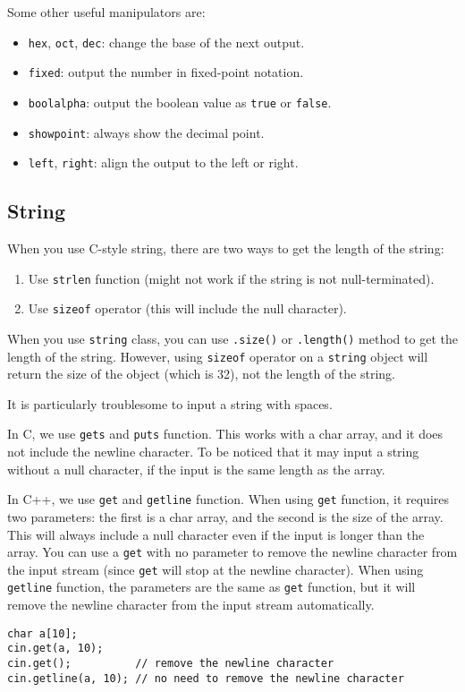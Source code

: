 \documentclass[a4paper,12pt]{article}
\begin{document}
Some other useful manipulators are:
\begin{itemize}
	\item \texttt{hex}, \texttt{oct}, \texttt{dec}: change the base of the next output.
	\item \texttt{fixed}: output the number in fixed-point notation.
	\item \texttt{boolalpha}: output the boolean value as \texttt{true} or \texttt{false}.
	\item \texttt{showpoint}: always show the decimal point.
	\item \texttt{left}, \texttt{right}: align the output to the left or right.
\end{itemize}

\subsection{String}

When you use C-style string, there are two ways to get the length of the string:
\begin{enumerate}
	\item Use \texttt{strlen} function (might not work if the string is not null-terminated).
	\item Use \texttt{sizeof} operator (this will include the null character).
\end{enumerate}

When you use \texttt{string} class, you can use \texttt{.size()} or \texttt{.length()} method to get the length of the string.
However, using \texttt{sizeof} operator on a \texttt{string} object will return the size of the object (which is 32), not the length of the string.

\vspace{1cm}

It is particularly troublesome to input a string with spaces.

In C, we use \texttt{gets} and \texttt{puts} function.
This works with a char array, and it does not include the newline character.
To be noticed that it may input a string without a null character, if the input is the same length as the array.

In C++, we use \texttt{get} and \texttt{getline} function.
When using \texttt{get} function, it requires two parameters: the first is a char array, and the second is the size of the array.
This will always include a null character even if the input is longer than the array.
You can use a \texttt{get} with no parameter to remove the newline character from the input stream (since \texttt{get} will stop at the newline character).
When using \texttt{getline} function, the parameters are the same as \texttt{get} function, but it will remove the newline character from the input stream automatically.
\begin{verbatim}
char a[10];
cin.get(a, 10);
cin.get();          // remove the newline character
cin.getline(a, 10); // no need to remove the newline character
\end{verbatim}
\end{document}
